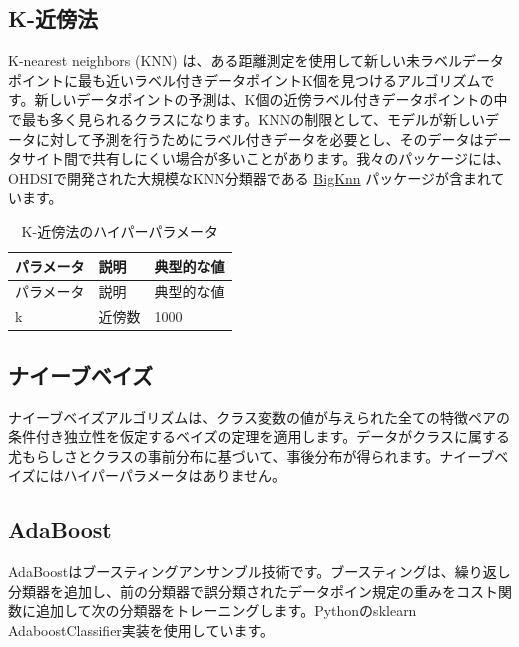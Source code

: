 \documentclass[
  11pt]{book}
\theoremstyle{definition}
\theoremstyle{definition}
\theoremstyle{definition}
\theoremstyle{definition}
\theoremstyle{remark}
\begin{document}
\subsection{K-近傍法}\label{k-ux8fd1ux508dux6cd5}

K-nearest neighbors (KNN) は、ある距離測定を使用して新しい未ラベルデータポイントに最も近いラベル付きデータポイントK個を見つけるアルゴリズムです。新しいデータポイントの予測は、K個の近傍ラベル付きデータポイントの中で最も多く見られるクラスになります。KNNの制限として、モデルが新しいデータに対して予測を行うためにラベル付きデータを必要とし、そのデータはデータサイト間で共有しにくい場合が多いことがあります。我々のパッケージには、OHDSIで開発された大規模なKNN分類器である \href{https://github.com/OHDSI/BigKnn}{BigKnn} パッケージが含まれています。  

\begin{longtable}[]{@{}lll@{}}
\caption{\label{tab:knnParameters} K-近傍法のハイパーパラメータ}\tabularnewline
\toprule\noalign{}
パラメータ & 説明 & 典型的な値 \\
\midrule\noalign{}
\endfirsthead
\toprule\noalign{}
パラメータ & 説明 & 典型的な値 \\
\midrule\noalign{}
\endhead
\bottomrule\noalign{}
\endlastfoot
k & 近傍数 & 1000 \\
\end{longtable}

\subsection{ナイーブベイズ}\label{ux30caux30a4ux30fcux30d6ux30d9ux30a4ux30ba}

ナイーブベイズアルゴリズムは、クラス変数の値が与えられた全ての特徴ペアの条件付き独立性を仮定するベイズの定理を適用します。データがクラスに属する尤もらしさとクラスの事前分布に基づいて、事後分布が得られます。ナイーブベイズにはハイパーパラメータはありません。 

\subsection{AdaBoost}\label{adaboost}

AdaBoostはブースティングアンサンブル技術です。ブースティングは、繰り返し分類器を追加し、前の分類器で誤分類されたデータポイン規定の重みをコスト関数に追加して次の分類器をトレーニングします。Pythonのsklearn AdaboostClassifier実装を使用しています。  
\end{document}
